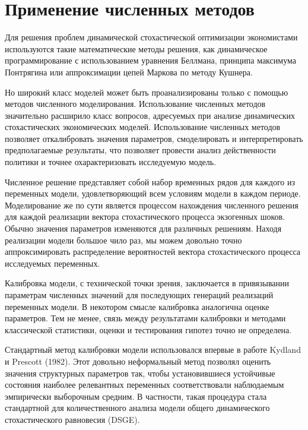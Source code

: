 \documentclass[12pt,a4paper, oneside]{extreport}
\begin{document}
 
\chapter{Применение численных  методов}



Для решения проблем динамической	  стохастической оптимизации экономистами используются такие  математические методы решения, как  динамическое программирование с использованием уравнения Беллмана,  принципа максимума Понтрягина или аппроксимации цепей Маркова по методу Кушнера.

Но широкий класс  моделей   может  быть проанализированы только с помощью методов  численного моделирования. 
Использование численных методов значительно расширило класс  вопросов, адресуемых при анализе динамических стохастических экономических моделей.
Использование численных методов позволяет откалибровать значения параметров, смоделировать  и интерпретировать  предполагаемые результаты, что позволяет провести  анализ действенности политики и точнее охарактеризовать исследуемую модель. 



Численное решение представляет собой набор временных рядов  для каждого  из переменных  модели, удовлетворяющий всем условиям модели в    каждом периоде. 
Моделирование же по сути является  процессом нахождения численного  решения  для каждой   реализации вектора  стохастического процесса экзогенных шоков. 
Обычно значения параметров  изменяются для различных  решениям. Находя реализации модели большое чило  раз, мы можем довольно точно аппроксимировать распределение вероятностей вектора  стохастического процесса исследуемых  переменных.


Калибровка модели, с  технической точки зрения,   заключается в привязывании параметрам  численных значений для последующих  генераций реализаций переменных модели. В некотором смысле  калибровка аналогична оценке параметров. Тем не менее, связь  между результатами калибровки  и  методами классической статистики, оценки и тестирования гипотез точно  не определена.

Стандартный метод калибровки модели использовался впервые в работе Kydland и Prescott (1982).  Этот довольно неформальный метод позволял оценить  значения  структурных параметров так, чтобы установившиеся устойчивые состояния   наиболее релевантных переменных соответствовали  наблюдаемым эмпирически выборочным средним.
В частности, такая процедура стала стандартной для   количественного анализа  модели общего  динамического стохастического равновесия (DSGE).
\end{document}
